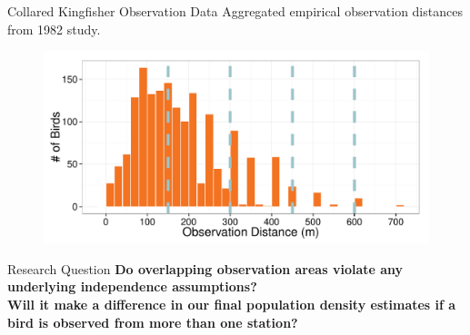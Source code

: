 \documentclass{beamer}
\begin{document}
\begin{frame}{Collared Kingfisher Observation Data}
Aggregated empirical observation distances from 1982 study.
\begin{figure}
	\includegraphics[width=\textwidth]{../images/histogram_dist_20m.pdf}
	\label{fig:82dist}
\end{figure}

\end{frame}

\begin{frame}{Research Question}
\Large
{\bfseries Do overlapping observation areas violate any underlying independence assumptions?}\\
\vspace{1cm}
{\bfseries Will it make a difference in our final population density estimates if a bird is observed from more than one station?}
\end{frame}
\end{document}

